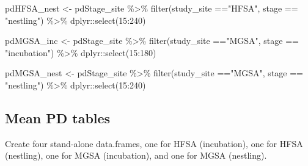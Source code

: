 \documentclass[
]{article}
\newenvironment{Shaded}{\begin{snugshade}}{\end{snugshade}}
\newcommand{\FunctionTok}[1]{\textcolor[rgb]{0.00,0.00,0.00}{#1}}
\newcommand{\NormalTok}[1]{#1}
\newcommand{\OtherTok}[1]{\textcolor[rgb]{0.56,0.35,0.01}{#1}}
\newcommand{\SpecialCharTok}[1]{\textcolor[rgb]{0.00,0.00,0.00}{#1}}
\newcommand{\StringTok}[1]{\textcolor[rgb]{0.31,0.60,0.02}{#1}}
\begin{document}
\begin{Shaded}
\begin{Highlighting}[]
\NormalTok{pdHFSA\_nest }\OtherTok{\textless{}{-}}\NormalTok{ pdStage\_site }\SpecialCharTok{\%\textgreater{}\%} 
  \FunctionTok{filter}\NormalTok{(study\_site }\SpecialCharTok{==}\StringTok{"HFSA"}\NormalTok{, stage }\SpecialCharTok{==} \StringTok{"nestling"}\NormalTok{) }\SpecialCharTok{\%\textgreater{}\%}
\NormalTok{  dplyr}\SpecialCharTok{::}\FunctionTok{select}\NormalTok{(}\StringTok{\textquotesingle{}15\textquotesingle{}}\SpecialCharTok{:}\StringTok{\textquotesingle{}240\textquotesingle{}}\NormalTok{)}

\NormalTok{pdMGSA\_inc }\OtherTok{\textless{}{-}}\NormalTok{ pdStage\_site }\SpecialCharTok{\%\textgreater{}\%}
  \FunctionTok{filter}\NormalTok{(study\_site }\SpecialCharTok{==}\StringTok{"MGSA"}\NormalTok{, stage }\SpecialCharTok{==} \StringTok{"incubation"}\NormalTok{) }\SpecialCharTok{\%\textgreater{}\%}
\NormalTok{  dplyr}\SpecialCharTok{::}\FunctionTok{select}\NormalTok{(}\StringTok{\textquotesingle{}15\textquotesingle{}}\SpecialCharTok{:}\StringTok{\textquotesingle{}180\textquotesingle{}}\NormalTok{)}
         
\NormalTok{pdMGSA\_nest }\OtherTok{\textless{}{-}}\NormalTok{ pdStage\_site }\SpecialCharTok{\%\textgreater{}\%}
  \FunctionTok{filter}\NormalTok{(study\_site }\SpecialCharTok{==}\StringTok{"MGSA"}\NormalTok{, stage }\SpecialCharTok{==} \StringTok{"nestling"}\NormalTok{) }\SpecialCharTok{\%\textgreater{}\%}
\NormalTok{  dplyr}\SpecialCharTok{::}\FunctionTok{select}\NormalTok{(}\StringTok{\textquotesingle{}15\textquotesingle{}}\SpecialCharTok{:}\StringTok{\textquotesingle{}240\textquotesingle{}}\NormalTok{)}
\end{Highlighting}
\end{Shaded}

\hypertarget{mean-pd-tables-1}{%
\subsection{Mean PD tables}\label{mean-pd-tables-1}}

Create four stand-alone data.frames, one for HFSA (incubation), one for
HFSA (nestling), one for MGSA (incubation), and one for MGSA (nestling).
\end{document}
